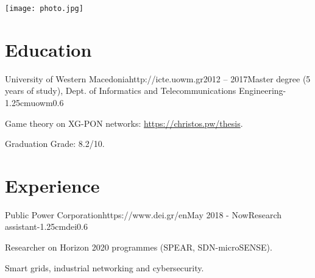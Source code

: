 \documentclass{mycv}
\begin{document}
	\thispagestyle{plain}
	\begin{minipage}{.7\textwidth}
		\begin{flushleft}
			\birth
		\end{flushleft}
	\end{minipage}
	\begin{minipage}{.3\textwidth}
		\begin{flushright}
			\texttt{[image: photo.jpg]}
		\end{flushright}
	\end{minipage}
	\vspace*{-0.75cm}
	\section{Education}
	
	\begin{EntryDatedLogo}{University of Western Macedonia}{http://icte.uowm.gr}{2012 -- 2017}{Master degree (5 years of study), Dept. of Informatics and Telecommunications Engineering}{-1.25cm}{uowm}{0.6}
		\begin{Itemize}
			\item Game theory on XG-PON networks: \url{https://christos.pw/thesis}.
			\item Graduation Grade: 8.2/10.
		\end{Itemize}
	\end{EntryDatedLogo}
	
	\section{Experience}
		\begin{EntryDatedLogo}{Public Power Corporation}{https://www.dei.gr/en}{May 2018 - Now}{Research assistant}{-1.25cm}{dei}{0.6}
		\begin{Itemize}
			\item Researcher on Horizon 2020 programmes (SPEAR, SDN-microSENSE).
			\item Smart grids, industrial networking and cybersecurity.
		\end{Itemize}
	\end{EntryDatedLogo}
	
\end{document}

